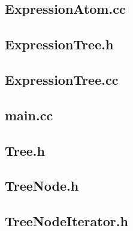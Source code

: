 \documentclass[a4paper,10pt]{article}
\begin{document}
\subsection*{ExpressionAtom.cc}

\subsection*{ExpressionTree.h}

\subsection*{ExpressionTree.cc}

\subsection*{main.cc}

\subsection*{Tree.h}

\subsection*{TreeNode.h}

\subsection*{TreeNodeIterator.h}

\end{document}
